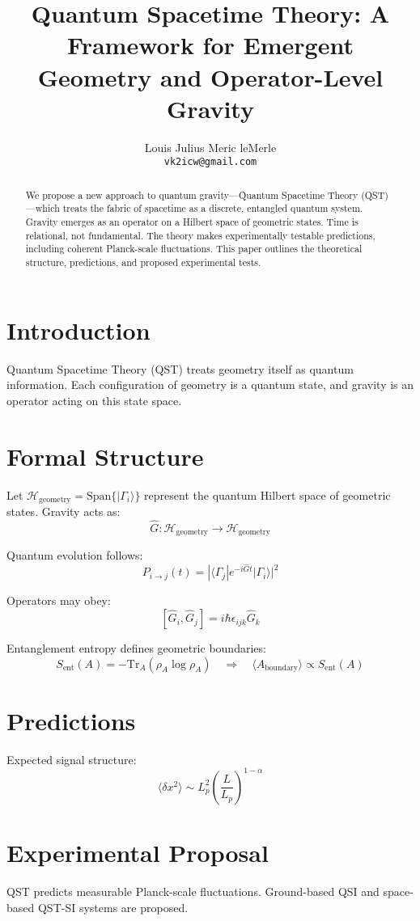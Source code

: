 \documentclass[12pt]{article}
\title{Quantum Spacetime Theory: A Framework for Emergent Geometry and Operator-Level Gravity}
\author{Louis Julius Meric leMerle\\\texttt{vk2icw@gmail.com}}
\date{}
\begin{document}
\maketitle

\begin{abstract}
We propose a new approach to quantum gravity---Quantum Spacetime Theory (QST)---which treats the fabric of spacetime as a discrete, entangled quantum system. Gravity emerges as an operator on a Hilbert space of geometric states. Time is relational, not fundamental. The theory makes experimentally testable predictions, including coherent Planck-scale fluctuations. This paper outlines the theoretical structure, predictions, and proposed experimental tests.
\end{abstract}

\section{Introduction}
Quantum Spacetime Theory (QST) treats geometry itself as quantum information. Each configuration of geometry is a quantum state, and gravity is an operator acting on this state space.

\section{Formal Structure}
Let $\mathcal{H}_{\text{geometry}} = \text{Span} \{ |\Gamma_i\rangle \}$ represent the quantum Hilbert space of geometric states. Gravity acts as:
\[
\hat{G}: \mathcal{H}_{\text{geometry}} \rightarrow \mathcal{H}_{\text{geometry}}
\]

Quantum evolution follows:
\[
P_{i \rightarrow j}(t) = |\langle \Gamma_j | e^{-i \hat{G} t} | \Gamma_i \rangle|^2
\]

Operators may obey:
\[
[\hat{G}_i, \hat{G}_j] = i \hbar \epsilon_{ijk} \hat{G}_k
\]

Entanglement entropy defines geometric boundaries:
\[
S_{\text{ent}}(A) = -\text{Tr}_A(\rho_A \log \rho_A)
\quad \Rightarrow \quad
\langle A_{\text{boundary}} \rangle \propto S_{\text{ent}}(A)
\]

\section{Predictions}
Expected signal structure:
\[
\langle \delta x^2 \rangle \sim L_p^2 \left( \frac{L}{L_p} \right)^{1 - \alpha}
\]

\section{Experimental Proposal}
QST predicts measurable Planck-scale fluctuations. Ground-based QSI and space-based QST-SI systems are proposed.
\end{document}
